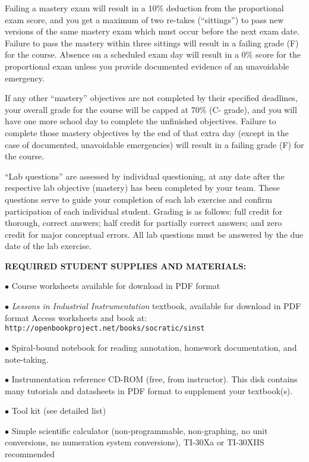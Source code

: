 \vskip 10pt

Failing a mastery exam will result in a 10\% deduction from the proportional exam score, and you get a maximum of two re-takes (``sittings'') to pass new versions of the same mastery exam which must occur before the next exam date.  Failure to pass the mastery within three sittings will result in a failing grade (F) for the course.  Absence on a scheduled exam day will result in a 0\% score for the proportional exam unless you provide documented evidence of an unavoidable emergency.  

If any other ``mastery'' objectives are not completed by their specified deadlines, your overall grade for the course will be capped at 70\% (C- grade), and you will have one more school day to complete the unfinished objectives.  Failure to complete those mastery objectives by the end of that extra day (except in the case of documented, unavoidable emergencies) will result in a failing grade (F) for the course.

``Lab questions'' are assessed by individual questioning, at any date after the respective lab objective (mastery) has been completed by your team.  These questions serve to guide your completion of each lab exercise and confirm participation of each individual student.  Grading is as follows: full credit for thorough, correct answers; half credit for partially correct answers; and zero credit for major conceptual errors.  All lab questions must be answered by the due date of the lab exercise.


\vfil \eject

\noindent
{\bf REQUIRED STUDENT SUPPLIES AND MATERIALS:} 

\item{$\bullet$} Course worksheets available for download in PDF format
\item{$\bullet$} {\it Lessons in Industrial Instrumentation} textbook, available for download in PDF format
\itemitem{$\rightarrow$} Access worksheets and book at: {\tt http://openbookproject.net/books/socratic/sinst}
\item{$\bullet$} Spiral-bound notebook for reading annotation, homework documentation, and note-taking.
\item{$\bullet$} Instrumentation reference CD-ROM (free, from instructor).  This disk contains many tutorials and datasheets in PDF format to supplement your textbook(s).
\item{$\bullet$} Tool kit (see detailed list)
\item{$\bullet$} Simple scientific calculator (non-programmable, non-graphing, no unit conversions, no numeration system conversions), TI-30Xa or TI-30XIIS recommended

